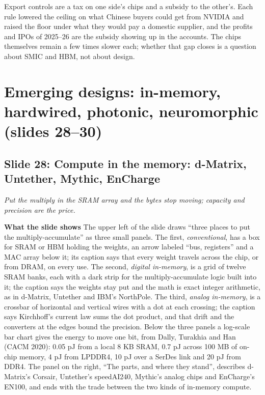 \documentclass[11pt,letterpaper]{article}
\newcommand{\setstage}[1]{\colorlet{stagec}{#1}}
\newcommand{\slide}[3]{%
  \subsection[Slide #1: #2]{Slide #1: #2}%
  {\color{muted}\itshape #3\par}\medskip}
\newcommand{\para}[1]{\medskip\noindent\textbf{#1}\quad}
\newenvironment{intuition}{\begin{tcolorbox}[intuitionbox]}{\end{tcolorbox}}
\begin{document}
\begin{intuition}
Export controls are a tax on one side's chips and a subsidy to the other's. Each rule lowered the ceiling on what Chinese buyers could get from NVIDIA and raised the floor under what they would pay a domestic supplier, and the profits and IPOs of 2025--26 are the subsidy showing up in the accounts. The chips themselves remain a few times slower each; whether that gap closes is a question about SMIC and HBM, not about design.
\end{intuition}
\setstage{outc}
\section{Emerging designs: in-memory, hardwired, photonic, neuromorphic (slides 28--30)}

\slide{28}{Compute in the memory: d-Matrix, Untether, Mythic, EnCharge}{Put the multiply in the SRAM array and the bytes stop moving; capacity and precision are the price.}

\para{What the slide shows} The upper left of the slide draws ``three places to put the multiply-accumulate'' as three small panels. The first, \emph{conventional}, has a box for SRAM or HBM holding the weights, an arrow labeled ``bus, registers'' and a MAC array below it; its caption says that every weight travels across the chip, or from DRAM, on every use. The second, \emph{digital in-memory}, is a grid of twelve SRAM banks, each with a dark strip for the multiply-accumulate logic built into it; the caption says the weights stay put and the math is exact integer arithmetic, as in d-Matrix, Untether and IBM's NorthPole. The third, \emph{analog in-memory}, is a crossbar of horizontal and vertical wires with a dot at each crossing; the caption says Kirchhoff's current law sums the dot product, and that drift and the converters at the edges bound the precision. Below the three panels a log-scale bar chart gives the energy to move one bit, from Dally, Turakhia and Han (CACM 2020): 0.05 pJ from a local 8 KB SRAM, 0.7 pJ across 100 MB of on-chip memory, 4 pJ from LPDDR4, 10 pJ over a SerDes link and 20 pJ from DDR4. The panel on the right, ``The parts, and where they stand'', describes d-Matrix's Corsair, Untether's speedAI240, Mythic's analog chips and EnCharge's EN100, and ends with the trade between the two kinds of in-memory compute.
\end{document}

